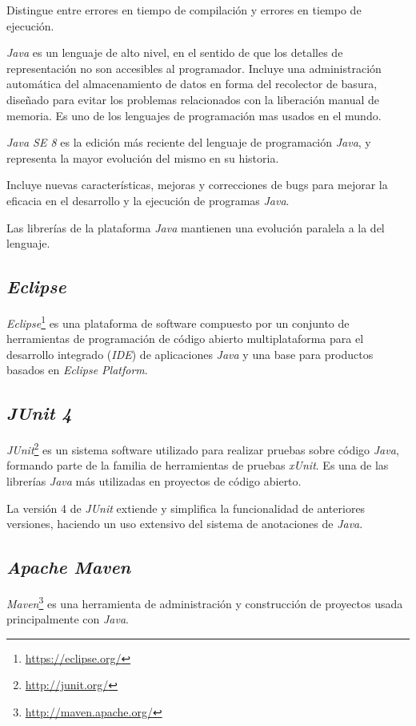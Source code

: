Distingue entre errores en tiempo de compilación y errores en tiempo de ejecución.

\textit{Java} es un lenguaje de alto nivel, en el sentido de que los detalles de representación no son accesibles al programador. 
Incluye una administración automática del almacenamiento de datos en forma del recolector de basura, diseñado para evitar los problemas relacionados con la liberación manual de memoria. Es uno de los lenguajes de programación mas usados en el mundo.\cite{java}

\textit{Java SE 8} es la edición más reciente del lenguaje de programación \textit{Java}, y representa la mayor evolución del mismo en su historia.

Incluye nuevas características, mejoras y correcciones de bugs para mejorar la eficacia en el desarrollo y la ejecución de programas \textit{Java}. 
 
Las librerías de la plataforma \textit{Java} mantienen una evolución paralela a la del lenguaje.

\subsection{\textit{Eclipse}}
\textit{Eclipse}\footnote{\url{https://eclipse.org/}} es una plataforma de software compuesto por un conjunto de herramientas de programación de código abierto multiplataforma para el desarrollo integrado (\textit{IDE}) de aplicaciones \textit{Java}  y una base para productos basados en \textit{Eclipse Platform}.


\subsection{\textit{JUnit 4}}
\textit{JUnit}\footnote{\url{http://junit.org/}} es un sistema software utilizado para realizar pruebas sobre código \textit{Java}, formando parte de la familia de herramientas de pruebas \textit{xUnit}.
Es una de las librerías \textit{Java} más utilizadas en proyectos de código abierto.

La versión 4 de \textit{JUnit} extiende y simplifica la funcionalidad de anteriores versiones, haciendo un uso extensivo del sistema de anotaciones de \textit{Java}.


\subsection{\textit{Apache Maven}}
\textit{Maven}\footnote{\url{http://maven.apache.org/}} es una herramienta de administración y construcción de proyectos usada principalmente con \textit{Java}.

